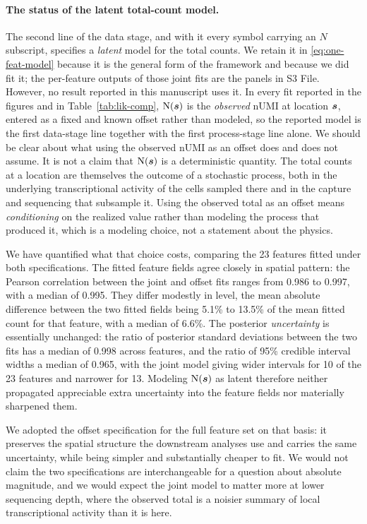 \documentclass[10pt,letterpaper]{article}
\begin{document}
\paragraph*{The status of the latent total-count model.} The second line of the data stage, and with it every symbol carrying an $N$ subscript, specifies a \textit{latent} model for the total counts. We retain it in \eqref{eq:one-feat-model} because it is the general form of the framework and because we did fit it; the per-feature outputs of those joint fits are the panels in S3 File. However, no result reported in this manuscript uses it. In every fit reported in the figures and in Table~\ref{tab:lik-comp}, $\mbox{N}(\mbox{\boldmath $s$})$ is the \textit{observed} nUMI at location $\mbox{\boldmath $s$}$, entered as a fixed and known offset rather than modeled, so the reported model is the first data-stage line together with the first process-stage line alone. We should be clear about what using the observed nUMI as an offset does and does not assume. It is not a claim that $\mbox{N}(\mbox{\boldmath $s$})$ is a deterministic quantity. The total counts at a location are themselves the outcome of a stochastic process, both in the underlying transcriptional activity of the cells sampled there and in the capture and sequencing that subsample it. Using the observed total as an offset means \textit{conditioning} on the realized value rather than modeling the process that produced it, which is a modeling choice, not a statement about the physics.

We have quantified what that choice costs, comparing the 23 features fitted under both specifications. The fitted feature fields agree closely in spatial pattern: the Pearson correlation between the joint and offset fits ranges from 0.986 to 0.997, with a median of 0.995. They differ modestly in level, the mean absolute difference between the two fitted fields being 5.1\% to 13.5\% of the mean fitted count for that feature, with a median of 6.6\%. The posterior \textit{uncertainty} is essentially unchanged: the ratio of posterior standard deviations between the two fits has a median of 0.998 across features, and the ratio of 95\% credible interval widths a median of 0.965, with the joint model giving wider intervals for 10 of the 23 features and narrower for 13. Modeling $\mbox{N}(\mbox{\boldmath $s$})$ as latent therefore neither propagated appreciable extra uncertainty into the feature fields nor materially sharpened them.

We adopted the offset specification for the full feature set on that basis: it preserves the spatial structure the downstream analyses use and carries the same uncertainty, while being simpler and substantially cheaper to fit. We would not claim the two specifications are interchangeable for a question about absolute magnitude, and we would expect the joint model to matter more at lower sequencing depth, where the observed total is a noisier summary of local transcriptional activity than it is here.
\end{document}
